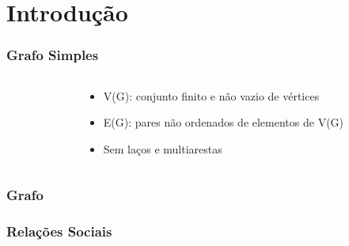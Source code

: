 \section{Introdução}
\begin{frame}
\frametitle{Grafo Simples}
\begin{columns}[T]
    \begin{column}{.75\textwidth}
    \end{column}
    \begin{column}{.25\textwidth}
       \begin{itemize}
            \item{V(G): conjunto finito e não vazio de vértices}
            \item{E(G): pares não ordenados de elementos de V(G)}
            \item{Sem laços e multiarestas}
        \end{itemize}
    \end{column}
  \end{columns}
\end{frame}

\begin{frame}
\frametitle{Grafo}
\frametitle{Relações Sociais}
\centering
{}
\end{frame}

